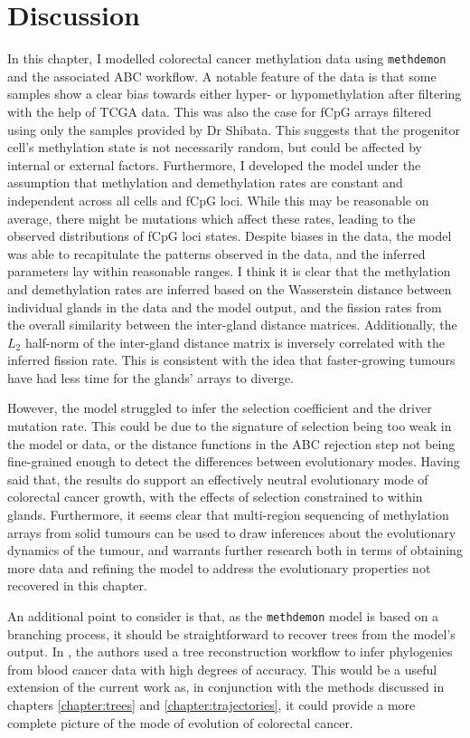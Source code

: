 \section{Discussion}
In this chapter, I modelled colorectal cancer methylation data using
\texttt{methdemon} and the associated ABC workflow. A notable feature of the
data is that some samples show a clear bias towards either hyper- or
hypomethylation after filtering with the help of TCGA data. This was also the
case for fCpG arrays filtered using only the samples provided by Dr Shibata.
This suggests that the progenitor cell's methylation state is not necessarily
random, but could be affected by internal or external factors. Furthermore, I
developed the model under the assumption that methylation and demethylation
rates are constant and independent across all cells and fCpG loci. While this
may be reasonable on average, there might be mutations which affect these
rates, leading to the observed distributions of fCpG loci states. Despite
biases in the data, the model was able to recapitulate the patterns observed in
the data, and the inferred parameters lay within reasonable ranges. I think it
is clear that the methylation and demethylation rates are inferred based on the
Wasserstein distance between individual glands in the data and the model
output, and the fission rates from the overall similarity between the
inter-gland distance matrices. Additionally, the $L_2$ half-norm of the
inter-gland distance matrix is inversely correlated with the inferred fission
rate. This is consistent with the idea that faster-growing tumours have had
less time for the glands' arrays to diverge. \par
However, the model struggled to infer the selection coefficient and the driver
mutation rate. This could be due to the signature of selection being too weak
in the model or data, or the distance functions in the ABC rejection step not
being fine-grained enough to detect the differences between evolutionary modes.
Having said that, the results do support an effectively neutral evolutionary
mode of colorectal cancer growth, with the effects of selection constrained to
within glands. Furthermore, it seems clear that multi-region sequencing of
methylation arrays from solid tumours can be used to draw inferences about the
evolutionary dynamics of the tumour, and warrants further research both in
terms of obtaining more data and refining the model to address the evolutionary
properties not recovered in this chapter. \par
An additional point to consider is that, as the \texttt{methdemon} model is
based on a branching process, it should be straightforward to recover trees from
the model's output. In \cite{gabbutt_evolutionary_2023}, the authors used a tree
reconstruction workflow to infer phylogenies from blood cancer data with high
degrees of accuracy. This would be a useful extension of the current work as, in
conjunction with the methods discussed in chapters \ref{chapter:trees} and
\ref{chapter:trajectories}, it could provide a more complete picture of the mode
of evolution of colorectal cancer.
